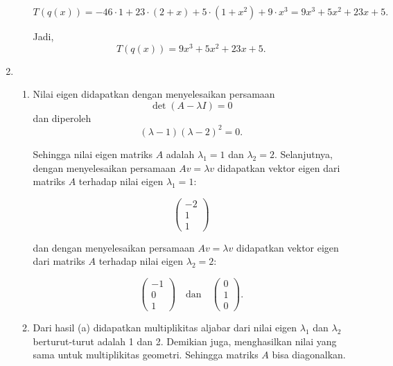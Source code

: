\documentclass[11pt,letterpaper]{article}
\begin{document}
\begin{enumerate}
\begin{enumerate}
                \[
                  T(q(x)) = -46 \cdot 1 + 23 \cdot (2 + x) + 5 \cdot (1 + x^2) + 9 \cdot x^3
                  = 9x^3 + 5x^2 + 23x + 5.
                \]

                Jadi,
                \[
                  T(q(x)) = 9x^3 + 5x^2 + 23x + 5.
                \]

        \end{enumerate}
  \item \begin{enumerate}
          \item Nilai eigen didapatkan dengan menyelesaikan persamaan
                \[
                  \det(A - \lambda I) = 0
                \]
                dan diperoleh
                \[
                  (\lambda - 1)(\lambda - 2)^2 = 0. \tag{1}
                \]

                Sehingga nilai eigen matriks $A$ adalah $\lambda_1 = 1$ dan $\lambda_2 = 2$.
                Selanjutnya, dengan menyelesaikan persamaan $A v = \lambda v$ didapatkan vektor eigen dari matriks $A$ terhadap nilai eigen $\lambda_1 = 1$:

                \[
                  \begin{pmatrix}
                    -2 \\[4pt]
                    1  \\[4pt]
                    1
                  \end{pmatrix}
                \]

                dan dengan menyelesaikan persamaan $A v = \lambda v$ didapatkan vektor eigen dari matriks $A$ terhadap nilai eigen $\lambda_2 = 2$:

                \[
                  \begin{pmatrix}
                    -1 \\[4pt]
                    0  \\[4pt]
                    1
                  \end{pmatrix}
                  \quad \text{dan} \quad
                  \begin{pmatrix}
                    0 \\[4pt]
                    1 \\[4pt]
                    0
                  \end{pmatrix}.
                \]

          \item Dari hasil (a) didapatkan multiplikitas aljabar dari nilai eigen $\lambda_1$ dan $\lambda_2$ berturut-turut adalah 1 dan 2.
                Demikian juga, menghasilkan nilai yang sama untuk multiplikitas geometri.
                Sehingga matriks $A$ bisa diagonalkan.
        \end{enumerate}
\end{enumerate}
\end{document}
